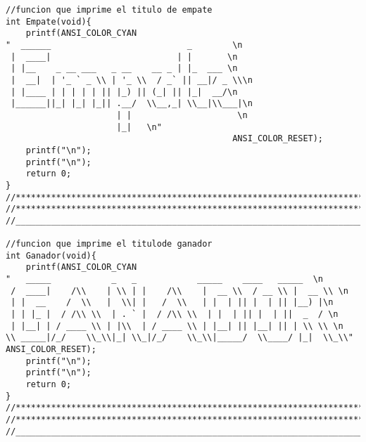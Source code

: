 \begin{verbatim}
//funcion que imprime el titulo de empate
int Empate(void){
    printf(ANSI_COLOR_CYAN 
"  ______                           _        \n
 |  ____|                         | |       \n
 | |__    _ __ ___   _ __    __ _ | |_  ___ \n
 |  __|  | '_ ` _ \\ | '_ \\  / _` || __|/ _ \\\n
 | |____ | | | | | || |_) || (_| || |_|  __/\n
 |______||_| |_| |_|| .__/  \\__,_| \\__|\\___|\n
                      | |                     \n
                      |_|   \n" 
                                             ANSI_COLOR_RESET);
    printf("\n");
    printf("\n");
    return 0;
}
//*************************************************************************************
//*************************************************************************************
//_____________________________________________________________________________________

//funcion que imprime el titulode ganador
int Ganador(void){
    printf(ANSI_COLOR_CYAN 
"   _____            _   _            _____    ____   _____  \n
 /  ____|    /\\    | \\ | |    /\\    |  __ \\  / __ \\ |  __ \\ \n
 | |  __    /  \\   |  \\| |   /  \\   | |  | || |  | || |__) |\n
 | | |_ |  / /\\ \\  | . ` |  / /\\ \\  | |  | || |  | ||  _  / \n
 | |__| | / ____ \\ | |\\  | / ____ \\ | |__| || |__| || | \\ \\ \n
\\ _____|/_/    \\_\\|_| \\_|/_/    \\_\\|_____/  \\____/ |_|  \\_\\" 
ANSI_COLOR_RESET);
    printf("\n");
    printf("\n");
    return 0;
}
//*************************************************************************************
//*************************************************************************************
//_____________________________________________________________________________________



\end{verbatim}
